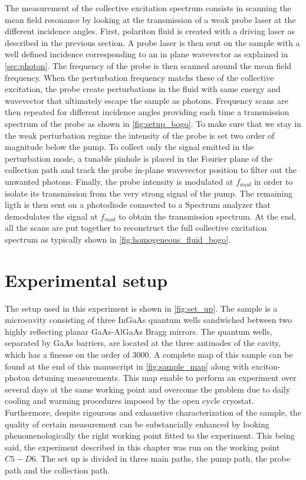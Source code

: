 \label{sub:high_resolution_spectroscopy}

The measurement of the collective excitation spectrum consists in scanning the mean field resonance by looking at the transmission of a weak probe laser at the different incidence angles. First, polariton fluid is created with a driving laser as described in the previous section. A probe laser is then sent on the sample with a well defined incidence corresponding to an in plane wavevector as explained in \autoref{sec:photon}. The frequency of 
the probe is then scanned around the mean field frequency. When the perturbation frequency matchs these of the collective excitation, the probe create perturbations in the fluid with same energy and wavevector that ultimately escape the sample as photons. Frequency scans are then repeated for different incidence angles providing each time a transmission spectrum of the probe as shown in \autoref{fig:setup_bogo}. 
To make sure that we stay in the weak perturbation regime the intensity of the probe is set two order of magnitude below the pump. To collect only the signal emitted in the perturbation mode, a tunable pinhole is placed in the Fourier plane of the collection path and track the probe in-plane wavevector position to filter out the unwanted photons. Finally, the probe intensity is modulated at $f_{mod}$ in order to isolate its transmission from the very strong signal of the pump. The remaining ligth is then sent on
a photodiode connected to a Spectrum analyzer that demodulates the signal at $f_{mod}$ to obtain the transmission spectrum. At the end, all the scans are put together to reconstruct the full collective excitation spectrum as typically shown in \autoref{fig:homogeneous_fluid_bogo}.



\section{Experimental setup}
The setup used in this experiment is shown in \autoref{fig:set_up}. The sample is a microcavity consisting of three InGaAs quantum wells sandwiched between two highly reflecting planar GaAs-AlGaAs Bragg mirrors.
The quantum wells, separated by GaAs barriers, are located at the three antinodes of the cavity, which has a finesse on the order of 3000. A complete map of this sample 
 can be found at the end of this manuscript in \autoref{fig:sample_map} along with exciton-photon detuning measurements. This map enable to perform an experiment over several days at the same working point and overcome the problem due to daily cooling and warming procedures imposed by the open cycle cryostat. Furthermore, despite rigourous and exhaustive
 characterization of the sample, the quality of certain measurement can be substancially enhanced by looking phenomenologically the right working point fitted to the experiment. This being said, the experiment described in this chapter was run on the working point $C5-D6$.
 The set up is divided in three main paths, the pump path, the probe path and the collection path.


